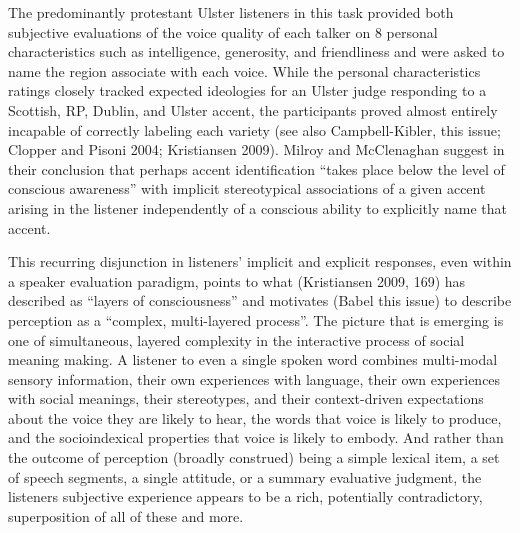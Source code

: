 \documentclass[
  letterpaper,
  DIV=11,
  numbers=noendperiod]{scrartcl}
\begin{document}
The predominantly protestant Ulster listeners in this task provided both
subjective evaluations of the voice quality of each talker on 8 personal
characteristics such as intelligence, generosity, and friendliness and
were asked to name the region associate with each voice. While the
personal characteristics ratings closely tracked expected ideologies for
an Ulster judge responding to a Scottish, RP, Dublin, and Ulster accent,
the participants proved almost entirely incapable of correctly labeling
each variety (see also Campbell-Kibler, this issue; Clopper and Pisoni
2004; Kristiansen 2009). Milroy and McClenaghan suggest in their
conclusion that perhaps accent identification ``takes place below the
level of conscious awareness'' with implicit stereotypical associations
of a given accent arising in the listener independently of a conscious
ability to explicitly name that accent.

This recurring disjunction in listeners' implicit and explicit
responses, even within a speaker evaluation paradigm, points to what
(Kristiansen 2009, 169) has described as ``layers of consciousness'' and
motivates (Babel this issue) to describe perception as a ``complex,
multi-layered process''. The picture that is emerging is one of
simultaneous, layered complexity in the interactive process of social
meaning making. A listener to even a single spoken word combines
multi-modal sensory information, their own experiences with language,
their own experiences with social meanings, their stereotypes, and their
context-driven expectations about the voice they are likely to hear, the
words that voice is likely to produce, and the socioindexical properties
that voice is likely to embody. And rather than the outcome of
perception (broadly construed) being a simple lexical item, a set of
speech segments, a single attitude, or a summary evaluative judgment,
the listeners subjective experience appears to be a rich, potentially
contradictory, superposition of all of these and more.
\end{document}
